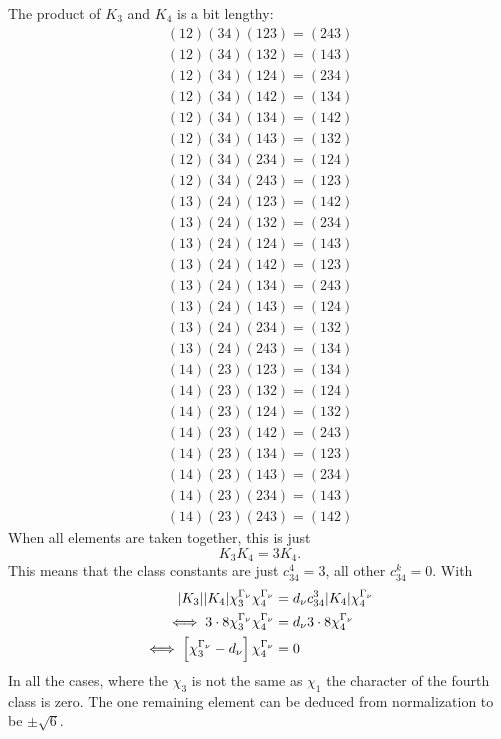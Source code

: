 \documentclass[11pt, english, fleqn, DIV=15, headinclude, BCOR=1cm]{scrartcl}
\begin{document}
The product of $K_3$ and $K_4$ is a bit lengthy:
\begin{gather*}
    (12)(34) (123) = (243) \\
    (12)(34) (132) = (143) \\
    (12)(34) (124) = (234) \\
    (12)(34) (142) = (134) \\
    (12)(34) (134) = (142) \\
    (12)(34) (143) = (132) \\
    (12)(34) (234) = (124) \\
    (12)(34) (243) = (123) \\
    (13)(24) (123) = (142) \\
    (13)(24) (132) = (234) \\
    (13)(24) (124) = (143) \\
    (13)(24) (142) = (123) \\
    (13)(24) (134) = (243) \\
    (13)(24) (143) = (124) \\
    (13)(24) (234) = (132) \\
    (13)(24) (243) = (134) \\
    (14)(23) (123) = (134) \\
    (14)(23) (132) = (124) \\
    (14)(23) (124) = (132) \\
    (14)(23) (142) = (243) \\
    (14)(23) (134) = (123) \\
    (14)(23) (143) = (234) \\
    (14)(23) (234) = (143) \\
    (14)(23) (243) = (142)
\end{gather*}
When all elements are taken together, this is just
\[
    K_3 K_4 = 3 K_4.
\]
This means that the class constants are just $c_{34}^4 = 3$, all other
$c_{34}^k = 0$. With
\begin{align*}
    |K_3| |K_4| \chi^{\Gamma_\nu}_3 \chi^{\Gamma_\nu}_4 &= d_\nu c_{34}^3
    |K_4| \chi^{\Gamma_\nu}_4 \\
    \iff 3 \cdot 8 \chi^{\Gamma_\nu}_3 \chi^{\Gamma_\nu}_4 &= d_\nu 3 \cdot 8
    \chi^{\Gamma_\nu}_4 \\
    \iff \left[ \chi^{\Gamma_\nu}_3 - d_\nu \right] \chi^{\Gamma_\nu}_4 &= 0 \\
\end{align*}
In all the cases, where the $\chi_3$ is not the same as $\chi_1$ the character
of the fourth class is zero. The one remaining element can be deduced from
normalization to be $\pm \sqrt 6$.
\end{document}
